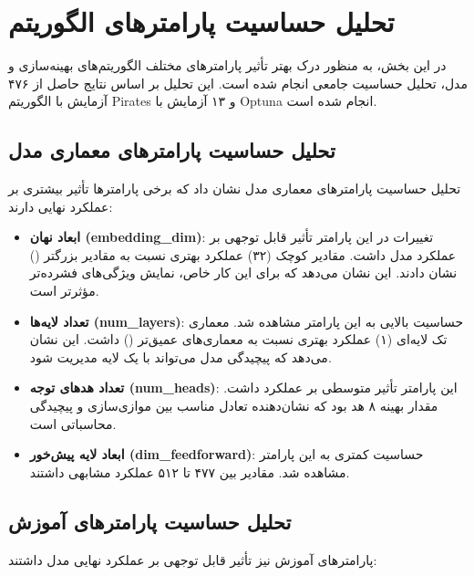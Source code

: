 \section{تحلیل حساسیت پارامترهای الگوریتم}
در این بخش، به منظور درک بهتر تأثیر پارامترهای مختلف الگوریتم‌های بهینه‌سازی و مدل، تحلیل حساسیت جامعی انجام شده است. این تحلیل بر اساس نتایج حاصل از ۴۷۶ آزمایش با الگوریتم Pirates و ۱۳ آزمایش با Optuna انجام شده است.

\subsection{تحلیل حساسیت پارامترهای معماری مدل}
تحلیل حساسیت پارامترهای معماری مدل نشان داد که برخی پارامترها تأثیر بیشتری بر عملکرد نهایی دارند:

\begin{itemize}
    \item \textbf{ابعاد نهان (embedding\_dim)}: تغییرات در این پارامتر تأثیر قابل توجهی بر عملکرد مدل داشت. مقادیر کوچک (۳۲) عملکرد بهتری نسبت به مقادیر بزرگتر () نشان دادند. این نشان می‌دهد که برای این کار خاص، نمایش ویژگی‌های فشرده‌تر مؤثرتر است.
    
    \item \textbf{تعداد لایه‌ها (num\_layers)}: حساسیت بالایی به این پارامتر مشاهده شد. معماری تک لایه‌ای (۱) عملکرد بهتری نسبت به معماری‌های عمیق‌تر () داشت. این نشان می‌دهد که پیچیدگی مدل می‌تواند با یک لایه مدیریت شود.
    
    \item \textbf{تعداد هدهای توجه (num\_heads)}: این پارامتر تأثیر متوسطی بر عملکرد داشت. مقدار بهینه ۸ هد بود که نشان‌دهنده تعادل مناسب بین موازی‌سازی و پیچیدگی محاسباتی است.
    
    \item \textbf{ابعاد لایه پیش‌خور (dim\_feedforward)}: حساسیت کمتری به این پارامتر مشاهده شد. مقادیر بین ۴۷۷ تا ۵۱۲ عملکرد مشابهی داشتند.
\end{itemize}

\subsection{تحلیل حساسیت پارامترهای آموزش}
پارامترهای آموزش نیز تأثیر قابل توجهی بر عملکرد نهایی مدل داشتند:


